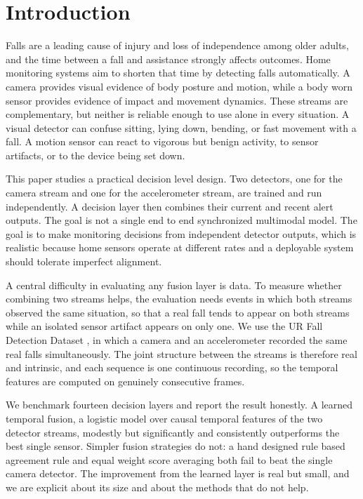 \documentclass[conference]{IEEEtran}
\begin{document}
\section{Introduction}
Falls are a leading cause of injury and loss of independence among older
adults, and the time between a fall and assistance strongly affects outcomes.
Home monitoring systems aim to shorten that time by detecting falls
automatically. A camera provides visual evidence of body posture and motion,
while a body worn sensor provides evidence of impact and movement dynamics.
These streams are complementary, but neither is reliable enough to use alone in
every situation. A visual detector can confuse sitting, lying down, bending, or
fast movement with a fall. A motion sensor can react to vigorous but benign
activity, to sensor artifacts, or to the device being set down.

This paper studies a practical decision level design. Two detectors, one for the
camera stream and one for the accelerometer stream, are trained and run
independently. A decision layer then combines their current and recent alert
outputs. The goal is not a single end to end synchronized multimodal model. The
goal is to make monitoring decisions from independent detector outputs, which is
realistic because home sensors operate at different rates and a deployable
system should tolerate imperfect alignment.

A central difficulty in evaluating any fusion layer is data. To measure whether
combining two streams helps, the evaluation needs events in which both streams
observed the same situation, so that a real fall tends to appear on both streams
while an isolated sensor artifact appears on only one. We use the UR Fall
Detection Dataset \cite{kwolek2014}, in which a camera and an accelerometer
recorded the same real falls simultaneously. The joint structure between the
streams is therefore real and intrinsic, and each sequence is one continuous
recording, so the temporal features are computed on genuinely consecutive
frames.

We benchmark fourteen decision layers and report the result honestly. A learned
temporal fusion, a logistic model over causal temporal features of the two
detector streams, modestly but significantly and consistently outperforms the
best single sensor. Simpler fusion strategies do not: a hand designed rule based
agreement rule and equal weight score averaging both fail to beat the single
camera detector. The improvement from the learned layer is real but small, and
we are explicit about its size and about the methods that do not help.
\end{document}
